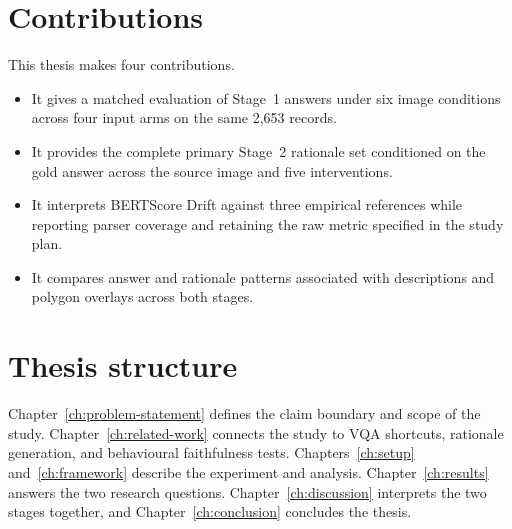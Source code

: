 \section{Contributions}
\label{sec:intro-contributions}

This thesis makes four contributions.

\begin{itemize}
\item It gives a matched evaluation of Stage~1 answers under six image conditions across four
input arms on the same 2,653 records.
\item It provides the complete primary Stage~2 rationale set conditioned on the
gold answer across the source image and five interventions.
\item It interprets BERTScore Drift against three empirical references while
reporting parser coverage and retaining the raw metric specified in the study plan.
\item It compares answer and rationale patterns associated with descriptions
and polygon overlays across both stages.
\end{itemize}

\section{Thesis structure}
\label{sec:intro-overview}

Chapter~\ref{ch:problem-statement} defines the claim boundary and scope of the
study.
Chapter~\ref{ch:related-work} connects the study to VQA shortcuts, rationale
generation, and behavioural faithfulness tests. Chapters~\ref{ch:setup}
and~\ref{ch:framework} describe the experiment and analysis. Chapter~\ref{ch:results}
answers the two research questions. Chapter~\ref{ch:discussion} interprets the
two stages together, and Chapter~\ref{ch:conclusion} concludes the thesis.
